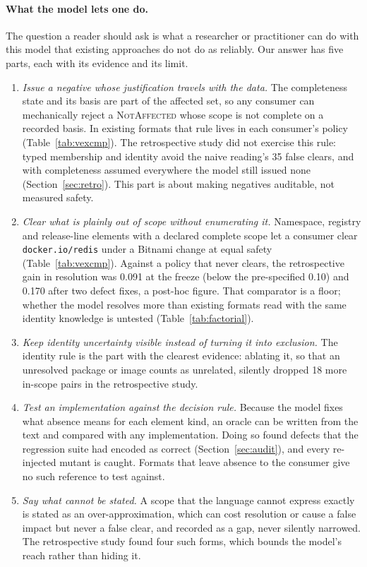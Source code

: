 \documentclass[11pt,a4paper]{article}
\newcommand{\code}[1]{\texttt{#1}}
\begin{document}
\paragraph{What the model lets one do.} The question a reader should
ask is what a researcher or practitioner can do with this model that
existing approaches do not do as reliably. Our answer has five parts,
each with its evidence and its limit.
\begin{enumerate}[leftmargin=*]
  \item \emph{Issue a negative whose justification travels with the
    data.} The completeness state and its basis are part of the
    affected set, so any consumer can mechanically reject a
    \textsc{NotAffected} whose scope is not complete on a recorded
    basis. In existing formats that rule lives in each consumer's
    policy (Table~\ref{tab:vexcmp}). The retrospective study did not
    exercise this rule: typed membership and identity avoid the naive
    reading's 35 false clears, and with completeness assumed
    everywhere the model still issued none (Section~\ref{sec:retro}).
    This part is about making negatives auditable, not measured safety.
  \item \emph{Clear what is plainly out of scope without enumerating
    it.} Namespace, registry and release-line elements with a declared
    complete scope let a consumer clear \code{docker.io/redis} under a
    Bitnami change at equal safety (Table~\ref{tab:vexcmp}). Against
    a policy that never clears, the retrospective gain in resolution
    was 0.091 at the freeze (below the pre-specified 0.10) and 0.170
    after two defect fixes, a post-hoc figure. That comparator is a
    floor; whether the model resolves more than existing formats read
    with the same identity knowledge is untested
    (Table~\ref{tab:factorial}).
  \item \emph{Keep identity uncertainty visible instead of turning it
    into exclusion.} The identity rule is the part with the clearest
    evidence: ablating it, so that an unresolved package or image
    counts as unrelated, silently dropped 18 more in-scope pairs in the
    retrospective study.
  \item \emph{Test an implementation against the decision rule.}
    Because the model fixes what absence means for each element kind,
    an oracle can be written from the text and compared with any
    implementation. Doing so found defects that the regression suite
    had encoded as correct (Section~\ref{sec:audit}), and every
    re-injected mutant is caught. Formats that leave absence to the
    consumer give no such reference to test against.
  \item \emph{Say what cannot be stated.} A scope that the language
    cannot express exactly is stated as an over-approximation, which
    can cost resolution or cause a false impact but never a false
    clear, and recorded as a gap, never silently narrowed. The retrospective study
    found four such forms, which bounds the model's reach rather than
    hiding it.
\end{enumerate}
\end{document}
